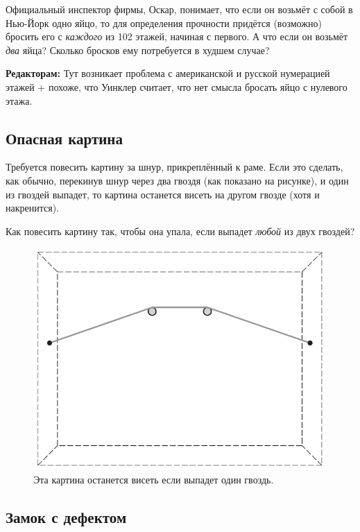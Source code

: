 Официальный инспектор фирмы, Оскар, понимает, что если он возьмёт с собой в Нью-Йорк одно яйцо,
то для определения прочности придётся (возможно) бросить его с \emph{каждого} из 102 %
этажей, начиная с первого.
А что если он возьмёт \emph{два} яйца?
Сколько бросков ему потребуется в худшем случае?

\begin{addedbytheeditors}
\textbf{Редакторам:}
Тут возникает проблема с американской и русской нумерацией этажей + похоже, что Уинклер считает, что нет смысла бросать яйцо с нулевого этажа.
\end{addedbytheeditors}


\subsection*{Опасная картина}

Требуется повесить картину за шнур, прикреплённый к раме.
Если это сделать, как обычно, перекинув шнур через два гвоздя (как показано на рисунке), и один из гвоздей выпадет, то картина останется висеть на другом гвозде (хотя и накренится).

Как повесить картину так, чтобы она упала, если выпадет \emph{любой} из двух гвоздей?

\begin{figure}[h!]
\centering
\includegraphics[scale=0.5]{pics/kartina1}
\caption{Эта картина останется висеть если выпадет один гвоздь.}
\label{pic:kartina1}
\end{figure}

\subsection*{Замок с дефектом}\label{Замок с дефектом}

